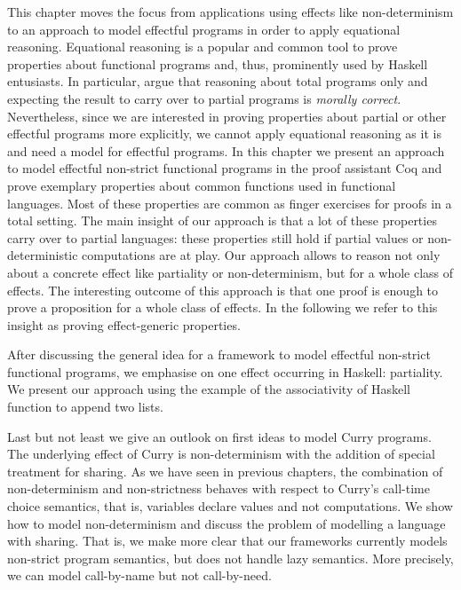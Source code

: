 
This chapter moves the focus from applications using effects like non-determinism to an approach to model effectful programs in order to apply equational reasoning.
Equational reasoning is a popular and common tool to prove properties about functional programs and, thus, prominently used by Haskell entusiasts. \citep{jeuring2012testing, gibbons2011just, hutton2008reasoning}
In particular, \citet{danielsson2006fast} argue that reasoning about total programs only and expecting the result to carry over to partial programs is \textit{morally correct}.
Nevertheless, since we are interested in proving properties about partial or other effectful programs more explicitly, we cannot apply equational reasoning as it is and need a model for effectful programs.
In this chapter we present an approach to model effectful non-strict functional programs in the proof assistant Coq and prove exemplary properties about common functions used in functional languages.
Most of these properties are common as finger exercises for proofs in a total setting.
The main insight of our approach is that a lot of these properties carry over to partial languages: these properties still hold if partial values or non-deterministic computations are at play.
Our approach allows to reason not only about a concrete effect like partiality or non-determinism, but for a whole class of effects.
The interesting outcome of this approach is that one proof is enough to prove a proposition for a whole class of effects.
In the following we refer to this insight as proving effect-generic properties.

After discussing the general idea for a framework to model effectful non-strict functional programs, we emphasise on one effect occurring in Haskell: partiality.
We present our approach using the example of the associativity of Haskell function to append two lists.

Last but not least we give an outlook on first ideas to model Curry programs.
The underlying effect of Curry is non-determinism with the addition of special treatment for sharing.
As we have seen in previous chapters, the combination of non-determinism and non-strictness behaves with respect to Curry's call-time choice semantics, that is, variables declare values and not computations.
We show how to model non-determinism and discuss the problem of modelling a language with sharing.
That is, we make more clear that our frameworks currently models non-strict program semantics, but does not handle lazy semantics.
More precisely, we can model call-by-name but not call-by-need.

